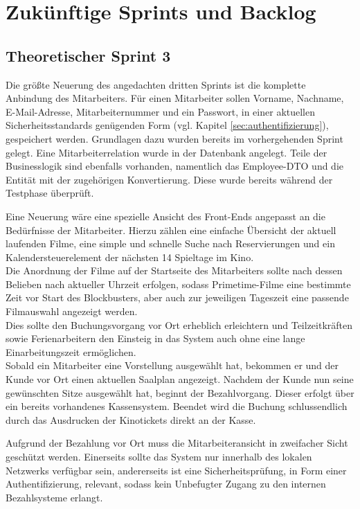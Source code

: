 \section{Zukünftige Sprints und Backlog}

\subsection{Theoretischer Sprint 3}
\label{ssec:theoretischer_sprint}
\multipleauthorsection{\authorRF}{\authorEJ, \authorNL}
Die größte Neuerung des angedachten dritten Sprints ist die komplette Anbindung des Mitarbeiters.
Für einen Mitarbeiter sollen Vorname, Nachname, E-Mail-Adresse, Mitarbeiternummer und ein Passwort, in einer aktuellen Sicherheitsstandards genügenden Form (vgl. Kapitel \vref{sec:authentifizierung}), gespeichert werden.
Grundlagen dazu wurden bereits im vorhergehenden Sprint gelegt.
Eine Mitarbeiterrelation wurde in der Datenbank angelegt.
Teile der Businesslogik sind ebenfalls vorhanden, namentlich das Employee-\acs{DTO} und die Entität mit der zugehörigen Konvertierung.
Diese wurde bereits während der Testphase überprüft.

Eine Neuerung wäre eine spezielle Ansicht des Front-Ends angepasst an die Bedürfnisse der Mitarbeiter.
Hierzu zählen eine einfache Übersicht der aktuell laufenden Filme, eine simple und schnelle Suche nach Reservierungen und ein Kalendersteuerelement der nächsten 14 Spieltage im Kino. \\
Die Anordnung der Filme auf der Startseite des Mitarbeiters sollte nach dessen Belieben \zb nach aktueller Uhrzeit erfolgen, sodass Primetime-Filme eine bestimmte Zeit vor Start des Blockbusters, aber auch zur jeweiligen Tageszeit eine passende Filmauswahl angezeigt werden. \\
Dies sollte den Buchungsvorgang vor Ort erheblich erleichtern und Teilzeitkräften sowie Ferienarbeitern den Einsteig in das System auch ohne eine lange Einarbeitungszeit ermöglichen. \\

Sobald ein Mitarbeiter eine Vorstellung ausgewählt hat, bekommen er und der Kunde vor Ort einen aktuellen Saalplan angezeigt.
Nachdem der Kunde nun seine gewünschten Sitze ausgewählt hat, beginnt der Bezahlvorgang.
Dieser erfolgt über ein bereits vorhandenes Kassensystem.
Beendet wird die Buchung schlussendlich durch das Ausdrucken der Kinotickets direkt an der Kasse.

Aufgrund der Bezahlung vor Ort muss die Mitarbeiteransicht in zweifacher Sicht geschützt werden.
Einerseits sollte das System nur innerhalb des lokalen Netzwerks verfügbar sein, andererseits ist eine Sicherheitsprüfung, in Form einer Authentifizierung, relevant, sodass kein Unbefugter Zugang zu den internen Bezahlsysteme erlangt.

